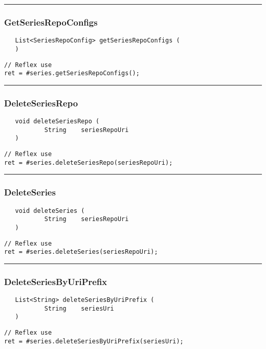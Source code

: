 \rule{15cm}{2pt}
\subsubsection{GetSeriesRepoConfigs}
\label{Api:GetSeriesRepoConfigs}
\begin{verbatim}
   List<SeriesRepoConfig> getSeriesRepoConfigs (
   )
\end{verbatim}
\begin{lstlisting}[language=reflex]
// Reflex use
ret = #series.getSeriesRepoConfigs();
\end{lstlisting}



\rule{15cm}{2pt}
\subsubsection{DeleteSeriesRepo}
\label{Api:DeleteSeriesRepo}
\begin{verbatim}
   void deleteSeriesRepo (
           String    seriesRepoUri
   )
\end{verbatim}
\begin{lstlisting}[language=reflex]
// Reflex use
ret = #series.deleteSeriesRepo(seriesRepoUri);
\end{lstlisting}



\rule{15cm}{2pt}
\subsubsection{DeleteSeries}
\label{Api:DeleteSeries}
\begin{verbatim}
   void deleteSeries (
           String    seriesRepoUri
   )
\end{verbatim}
\begin{lstlisting}[language=reflex]
// Reflex use
ret = #series.deleteSeries(seriesRepoUri);
\end{lstlisting}



\rule{15cm}{2pt}
\subsubsection{DeleteSeriesByUriPrefix}
\label{Api:DeleteSeriesByUriPrefix}
\begin{verbatim}
   List<String> deleteSeriesByUriPrefix (
           String    seriesUri
   )
\end{verbatim}
\begin{lstlisting}[language=reflex]
// Reflex use
ret = #series.deleteSeriesByUriPrefix(seriesUri);
\end{lstlisting}



